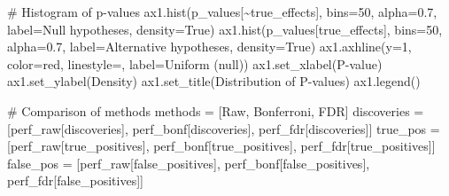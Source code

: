 \documentclass[
  11pt,
  letterpaper,
  oneside]{book}
\newenvironment{Shaded}{\begin{snugshade}}{\end{snugshade}}
\newcommand{\CommentTok}[1]{\textcolor[rgb]{0.37,0.37,0.37}{#1}}
\newcommand{\DecValTok}[1]{\textcolor[rgb]{0.68,0.00,0.00}{#1}}
\newcommand{\FloatTok}[1]{\textcolor[rgb]{0.68,0.00,0.00}{#1}}
\newcommand{\NormalTok}[1]{\textcolor[rgb]{0.00,0.23,0.31}{#1}}
\newcommand{\OperatorTok}[1]{\textcolor[rgb]{0.37,0.37,0.37}{#1}}
\newcommand{\StringTok}[1]{\textcolor[rgb]{0.13,0.47,0.30}{#1}}
\newcommand{\VariableTok}[1]{\textcolor[rgb]{0.07,0.07,0.07}{#1}}
\begin{document}
\begin{Shaded}
\begin{Highlighting}[]
\CommentTok{\# Histogram of p{-}values}
\NormalTok{ax1.hist(p\_values[}\OperatorTok{\textasciitilde{}}\NormalTok{true\_effects], bins}\OperatorTok{=}\DecValTok{50}\NormalTok{, alpha}\OperatorTok{=}\FloatTok{0.7}\NormalTok{, label}\OperatorTok{=}\StringTok{\textquotesingle{}Null hypotheses\textquotesingle{}}\NormalTok{, density}\OperatorTok{=}\VariableTok{True}\NormalTok{)}
\NormalTok{ax1.hist(p\_values[true\_effects], bins}\OperatorTok{=}\DecValTok{50}\NormalTok{, alpha}\OperatorTok{=}\FloatTok{0.7}\NormalTok{, label}\OperatorTok{=}\StringTok{\textquotesingle{}Alternative hypotheses\textquotesingle{}}\NormalTok{, density}\OperatorTok{=}\VariableTok{True}\NormalTok{)}
\NormalTok{ax1.axhline(y}\OperatorTok{=}\DecValTok{1}\NormalTok{, color}\OperatorTok{=}\StringTok{\textquotesingle{}red\textquotesingle{}}\NormalTok{, linestyle}\OperatorTok{=}\StringTok{\textquotesingle{}{-}{-}\textquotesingle{}}\NormalTok{, label}\OperatorTok{=}\StringTok{\textquotesingle{}Uniform (null)\textquotesingle{}}\NormalTok{)}
\NormalTok{ax1.set\_xlabel(}\StringTok{\textquotesingle{}P{-}value\textquotesingle{}}\NormalTok{)}
\NormalTok{ax1.set\_ylabel(}\StringTok{\textquotesingle{}Density\textquotesingle{}}\NormalTok{)}
\NormalTok{ax1.set\_title(}\StringTok{\textquotesingle{}Distribution of P{-}values\textquotesingle{}}\NormalTok{)}
\NormalTok{ax1.legend()}

\CommentTok{\# Comparison of methods}
\NormalTok{methods }\OperatorTok{=}\NormalTok{ [}\StringTok{\textquotesingle{}Raw\textquotesingle{}}\NormalTok{, }\StringTok{\textquotesingle{}Bonferroni\textquotesingle{}}\NormalTok{, }\StringTok{\textquotesingle{}FDR\textquotesingle{}}\NormalTok{]}
\NormalTok{discoveries }\OperatorTok{=}\NormalTok{ [perf\_raw[}\StringTok{\textquotesingle{}discoveries\textquotesingle{}}\NormalTok{], perf\_bonf[}\StringTok{\textquotesingle{}discoveries\textquotesingle{}}\NormalTok{], perf\_fdr[}\StringTok{\textquotesingle{}discoveries\textquotesingle{}}\NormalTok{]]}
\NormalTok{true\_pos }\OperatorTok{=}\NormalTok{ [perf\_raw[}\StringTok{\textquotesingle{}true\_positives\textquotesingle{}}\NormalTok{], perf\_bonf[}\StringTok{\textquotesingle{}true\_positives\textquotesingle{}}\NormalTok{], perf\_fdr[}\StringTok{\textquotesingle{}true\_positives\textquotesingle{}}\NormalTok{]]}
\NormalTok{false\_pos }\OperatorTok{=}\NormalTok{ [perf\_raw[}\StringTok{\textquotesingle{}false\_positives\textquotesingle{}}\NormalTok{], perf\_bonf[}\StringTok{\textquotesingle{}false\_positives\textquotesingle{}}\NormalTok{], perf\_fdr[}\StringTok{\textquotesingle{}false\_positives\textquotesingle{}}\NormalTok{]]}


\end{Highlighting}
\end{Shaded}
\end{document}
